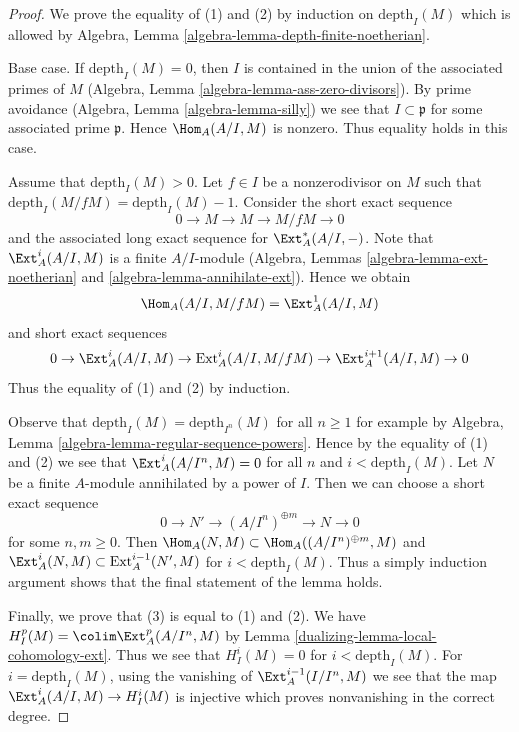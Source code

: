 \begin{proof}

We prove the equality of (1) and (2) by induction on $\text{depth}_I(M)$
which is allowed by
Algebra, Lemma \ref{algebra-lemma-depth-finite-noetherian}.

\medskip\noindent
Base case. If $\text{depth}_I(M) = 0$, then $I$ is contained in the union
of the associated primes of $M$
(Algebra, Lemma \ref{algebra-lemma-ass-zero-divisors}).
By prime avoidance (Algebra, Lemma \ref{algebra-lemma-silly})
we see that $I \subset \mathfrak p$ for some associated prime $\mathfrak p$.
Hence $\Hom_A(A/I, M)$
is nonzero. Thus equality holds in this case.

\medskip\noindent
Assume that $\text{depth}_I(M) > 0$. Let $f \in I$ be a nonzerodivisor
on $M$ such that $\text{depth}_I(M/fM) = \text{depth}_I(M) - 1$.
Consider the short exact sequence
$$
0 \to M \to M \to M/fM \to 0
$$
and the associated long exact sequence for $\Ext^*_A(A/I, -)$.
Note that $\Ext^i_A(A/I, M)$ is a finite $A/I$-module
(Algebra, Lemmas \ref{algebra-lemma-ext-noetherian} and
\ref{algebra-lemma-annihilate-ext}). Hence we obtain
$$
\Hom_A(A/I, M/fM) = \Ext^1_A(A/I, M)
$$
and short exact sequences
$$
0 \to \Ext^i_A(A/I, M) \to \text{Ext}^i_A(A/I, M/fM) \to
\Ext^{i + 1}_A(A/I, M) \to 0
$$
Thus the equality of (1) and (2) by induction.

\medskip\noindent
Observe that $\text{depth}_I(M) = \text{depth}_{I^n}(M)$ for all $n \geq 1$
for example by Algebra, Lemma \ref{algebra-lemma-regular-sequence-powers}.
Hence by the equality of (1) and (2) we see that
$\Ext^i_A(A/I^n, M) = 0$ for all $n$ and $i < \text{depth}_I(M)$.
Let $N$ be a finite $A$-module annihilated by a power of $I$.
Then we can choose a short exact sequence
$$
0 \to N' \to (A/I^n)^{\oplus m} \to N \to 0
$$
for some $n, m \geq 0$. Then
$\Hom_A(N, M) \subset \Hom_A((A/I^n)^{\oplus m}, M)$
and
$\Ext^i_A(N, M) \subset \text{Ext}^{i - 1}_A(N', M)$
for $i < \text{depth}_I(M)$. Thus a simply induction argument
shows that the final statement of the lemma holds.

\medskip\noindent
Finally, we prove that (3) is equal to (1) and (2).
We have $H^p_I(M) = \colim \Ext^p_A(A/I^n, M)$ by
Lemma \ref{dualizing-lemma-local-cohomology-ext}.
Thus we see that $H^i_I(M) = 0$ for $i < \text{depth}_I(M)$.
For $i = \text{depth}_I(M)$, using the vanishing of
$\Ext_A^{i - 1}(I/I^n, M)$ we see that the map
$\Ext_A^i(A/I, M) \to H_I^i(M)$ is injective which
proves nonvanishing in the correct degree.
\end{proof}

